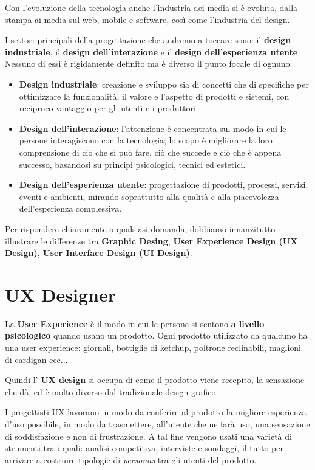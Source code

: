 \documentclass[a4paper,11pt,oneside]{book}
\begin{document}
Con l'evoluzione della tecnologia anche l'industria dei media si è evoluta, dalla stampa ai media sul web, mobile e software, così come l'industria del design.

I settori principali della progettazione che andremo a toccare sono: il \textbf{design industriale}, il \textbf{design dell'interazione} e il \textbf{design dell'esperienza utente}. Nessuno di essi è rigidamente definito ma è diverso il punto focale di ognuno:

\begin{itemize}
	\item \textbf{Design industriale}: creazione e sviluppo sia di concetti che di specifiche per ottimizzare la funzionalità, il valore e l'aspetto di prodotti e sistemi, con reciproco vantaggio per gli utenti e i produttori
	\item \textbf{Design dell'interazione}: l'attenzione è concentrata sul modo in cui le persone interagiscono con la tecnologia; lo scopo è migliorare la loro comprensione di ciò che si può fare, ciò che succede e ciò che è appena successo, basandosi su principi psicologici, tecnici ed estetici.
	      \pagebreak
	\item \textbf{Design dell'esperienza utente}: progettazione di prodotti, processi, servizi, eventi e ambienti, mirando soprattutto alla qualità e alla piacevolezza dell'esperienza complessiva.
\end{itemize}

Per rispondere chiaramente a qualsiasi domanda, dobbiamo innanzitutto illustrare le differenze tra \textbf{Graphic Desing}, \textbf{User Experience Design (UX Design)}, \textbf{User Interface Design (UI Design)}.

\section{UX Designer}
La \textbf{User Experience} è il modo in cui le persone si sentono \textbf{a livello psicologico} quando usano un prodotto. Ogni prodotto utilizzato da qualcuno ha una user experience: giornali, bottiglie di ketchup, poltrone reclinabili, maglioni di cardigan ecc...

Quindi l' \textbf{UX design} si occupa di come il prodotto viene recepito, la sensazione che dà, ed è molto diverso dal tradizionale design grafico.

I progettisti UX lavorano in modo da conferire al prodotto la migliore esperienza d'uso possibile, in modo da trasmettere, all'utente che ne farà uso, una sensazione di soddisfazione e non di frustrazione.
A tal fine vengono usati una varietà di strumenti tra i quali: analisi competitiva, interviste e sondaggi, il tutto per arrivare a costruire tipologie di \textit{personas} tra gli utenti del prodotto.
\end{document}
